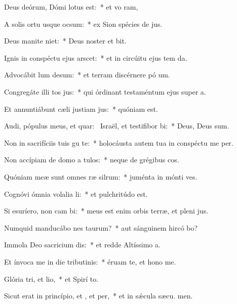 \item Deus deórum, Dómi lotus est:~* et vo ram,
\item A solis ortu usque  ocsum:~* ex Sion spécies de jus.
\item Deus manite niet:~* Deus noster et  bit.
\item Ignis in conspéctu ejus arscet:~* et in circúitu ejus tem da.
\item Advocábit lum desum:~* et terram discérnere pó um.
\item Congregáte illi tos jus:~* qui órdinant testaméntum ejus super a.
\item Et annuntiábunt cæli justiam jus:~* quóniam   est.
\item Audi, pópulus meus, et quar:~\pscross{} Israël, et testifibor bi:~* Deus, Deus   sum.
\item Non in sacrifíciis tuis gu te:~* holocáusta autem tua in conspéctu me  per.
\item Non accípiam de domo a tulos:~* neque de grégibus  cos.
\item Quóniam meæ sunt omnes ræ silrum:~* juménta in mónti  ves.
\item Cognóvi ómnia volalia li:~* et pulchritúdo   est.
\item Si esuríero, non cam bi:~* meus est enim orbis terræ, et pleni jus.
\item Numquid manducábo nes taurum?~* aut sánguinem hircó bo?
\item Immola Deo sacricium dis:~* et redde Altíssimo  a.
\item Et ínvoca me in die tributinis:~* éruam te, et hono me.
\item Glória tri, et lio,~* et Spirí to.
\item Sicut erat in princípio, et , et per,~* et in sǽcula sæcu. men.

